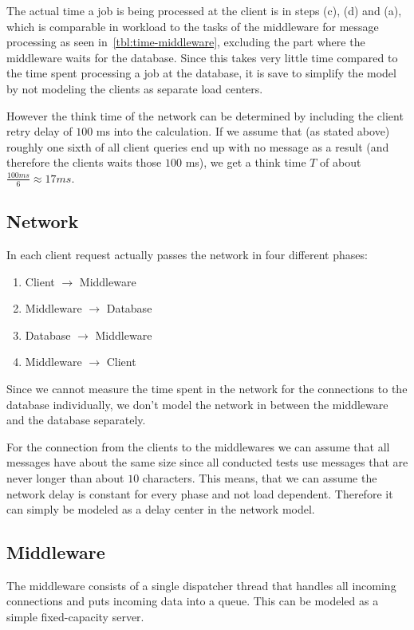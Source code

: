 \documentclass[a4paper, oneside]{csthesis}
\begin{document}
    The actual time a job is being processed at the client is in steps (c), (d)
    and (a), which is comparable in workload to the tasks of the middleware for
    message processing as seen in~\cref{tbl:time-middleware}, excluding the part
    where the middleware waits for the database. Since this takes very little time 
    compared to the time spent processing a job at the database, it is save to 
    simplify the model by not modeling the clients as separate load
    centers.
    
    However the think time of the network can be determined by including the
    client retry delay of $100$ ms into the calculation. If we assume that (as
    stated above) roughly one sixth of all client queries end up with no message
    as a result (and therefore the clients waits those $100$ ms), we get a think
    time $T$ of about $\frac{100ms}{6} \approx 17 ms$.

\subsection{Network}
    In \telesto each client request actually passes the network in four different 
    phases:

    \begin{enumerate}
        \item Client $\rightarrow$ Middleware
        \item Middleware $\rightarrow$ Database
        \item Database $\rightarrow$ Middleware
        \item Middleware $\rightarrow$ Client
    \end{enumerate}

    Since we cannot measure the time spent in the network for the connections to
    the database individually, we don't model the network in between the
    middleware and the database separately.

    For the connection from the clients to the middlewares we can assume that
    all messages have about the same size since all conducted tests use messages
    that are never longer than about $10$ characters. This means, that we can
    assume the network delay is constant for every phase and not load dependent.
    Therefore it can simply be modeled as a delay center in the network model.

\subsection{Middleware}
    The middleware consists of a single dispatcher thread that handles all
    incoming connections and puts incoming data into a queue. This can be
    modeled as a simple fixed-capacity server.
    
\end{document}
